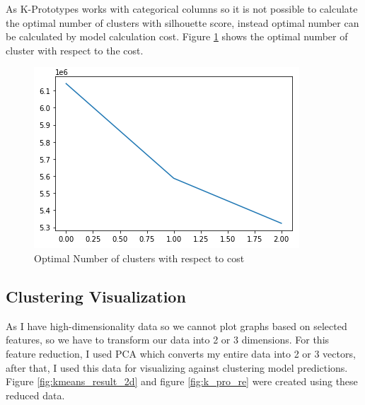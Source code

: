 \documentclass[12pt]{article}
\begin{document}
As K-Prototypes works with categorical columns so it is not possible to calculate the optimal number of clusters with silhouette score, instead optimal number can be calculated by model calculation cost. Figure \ref{fig:kp_cost} shows the optimal number of cluster with respect to the cost.
\begin{figure}[h!]
	\centering
	\includegraphics{kp_cost.png}
	\caption{Optimal Number of clusters with respect to cost}
	\label{fig:kp_cost}
\end{figure}

\subsection{Clustering Visualization}
As I have high-dimensionality data so we cannot plot graphs based on selected features, so we have to transform our data into 2 or 3 dimensions. For this feature reduction, I used PCA which converts my entire data into 2 or 3 vectors, after that, I used this data for visualizing against clustering model predictions.  Figure \ref{fig:kmeans_result_2d} and figure \ref{fig:k_pro_re} were created using these reduced data.
\end{document}
